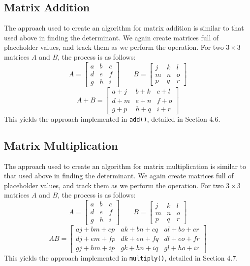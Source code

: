 \documentclass[12pt]{article}
\begin{document}
\subsection{Matrix Addition}
The approach used to create an algorithm for matrix addition is similar to that used above in finding the determinant. We again create matrices full of placeholder values, and track them as we perform the operation. For two $3\times3$ matrices $A$ and $B$, the process is as follows:
\[
A =
\begin{bmatrix}
    a & b & c \\
    d & e & f \\
    g & h & i
\end{bmatrix}
\qquad
B = 
\begin{bmatrix}
    j & k & l \\
    m & n & o \\
    p & q & r
\end{bmatrix}
\]
\begin{equation}
    A+B = 
    \begin{bmatrix}
    a + j & b + k & c + l \\
    d + m & e + n & f + o \\
    g + p & h + q & i + r
    \end{bmatrix}
\end{equation}
This yields the approach implemented in \texttt{add()}, detailed in Section 4.6.

\subsection{Matrix Multiplication}
The approach used to create an algorithm for matrix multiplication is similar to that used above in finding the determinant. We again create matrices full of placeholder values, and track them as we perform the operation. For two $3\times3$ matrices $A$ and $B$, the process is as follows:
\[
A =
\begin{bmatrix}
    a & b & c \\
    d & e & f \\
    g & h & i
\end{bmatrix}
\qquad
B = 
\begin{bmatrix}
    j & k & l \\
    m & n & o \\
    p & q & r
\end{bmatrix}
\]
\begin{equation}
    AB = 
    \begin{bmatrix}
    a j + b m + c p & a k + b n + c q & a l + b o + c r \\
    d j + e m + f p & d k + e n + f q & d l + e o + f r \\
    g j + h m + i p & g k + h n + i q & g l + h o + i r
    \end{bmatrix}
\end{equation}
This yields the approach implemented in \texttt{multiply()}, detailed in Section 4.7.
\end{document}
